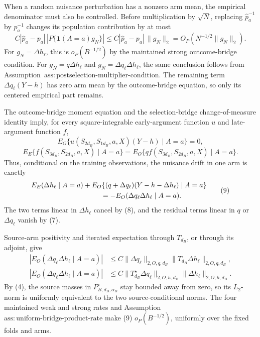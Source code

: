 When a random nuisance perturbation has a nonzero arm mean, the empirical denominator must also be controlled.  Before multiplication by \(\sqrt N\), replacing \(\widehat p_a^{-1}\) by \(p_a^{-1}\) changes its population contribution by at most
\[
 C|\widehat p_a-p_a|\,|P\{\mathbf1(A=a)g_N\}|
 \le C|\widehat p_a-p_a|\,\|g_N\|_2
 =O_P(N^{-1/2}\|g_N\|_2).                                   \tag{6}
\]
For \(g_N=\Delta h_\ell\), this is \(o_P(B^{-1/2})\) by the maintained strong outcome-bridge condition.  For \(g_N=q\Delta h_\ell\) and \(g_N=\Delta q_\ell\Delta h_\ell\), the same conclusion follows from Assumption~\(\mathrm{ass{:}postselection\text{-}multiplier\text{-}condition}\).  The remaining term \(\Delta q_\ell(Y-h)\) has zero arm mean by the outcome-bridge equation, so only its centered empirical part remains.

The outcome-bridge moment equation and the selection-bridge change-of-measure identity imply, for every square-integrable early-argument function \(u\) and late-argument function \(f\),
\[
 E_O\{u(S_{2d_B},S_{1d_B},a,X)(Y-h)\mid A=a\}=0,              \tag{7}
\]
\[
 E_E\{f(S_{3d_B},S_{2d_B},a,X)\mid A=a\}
 =E_O\{qf(S_{3d_B},S_{2d_B},a,X)\mid A=a\}.                 \tag{8}
\]
Thus, conditional on the training observations, the nuisance drift in one arm is exactly
\[
\begin{aligned}
 &E_E(\Delta h_\ell\mid A=a)
 +E_O\{(q+\Delta q_\ell)(Y-h-\Delta h_\ell)\mid A=a\}\\
 &\hspace{35mm}=-E_O(\Delta q_\ell\Delta h_\ell\mid A=a).
\end{aligned}                                                   \tag{9}
\]
The two terms linear in \(\Delta h_\ell\) cancel by (8), and the residual terms linear in \(q\) or \(\Delta q_\ell\) vanish by (7).

Source-arm positivity and iterated expectation through \(T_{d_B}\), or through its adjoint, give
\[
\begin{aligned}
 |E_O(\Delta q_\ell\Delta h_\ell\mid A=a)|
 &\le C\|\Delta q_\ell\|_{2,O,q,d_B}
       \|T_{d_B}\Delta h_\ell\|_{2,O,q,d_B},\\
 |E_O(\Delta q_\ell\Delta h_\ell\mid A=a)|
 &\le C\|T_{d_B}^{\star}\Delta q_\ell\|_{2,O,h,d_B}
       \|\Delta h_\ell\|_{2,O,h,d_B}.
\end{aligned}                                                   \tag{10}
\]
By (4), the source masses in \(P_{B,d_B,\alpha_B}^{\circ}\) stay bounded away from zero, so its \(L_2\)-norm is uniformly equivalent to the two source-conditional norms.  The four maintained weak and strong rates and Assumption~\(\mathrm{ass{:}uniform\text{-}bridge\text{-}product\text{-}rate}\) make (9) \(o_P(B^{-1/2})\), uniformly over the fixed folds and arms.


